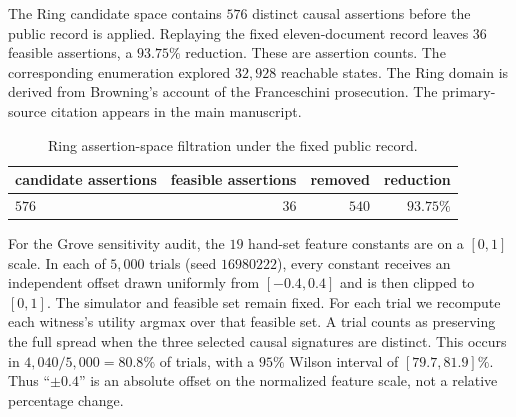 \documentclass[10pt]{article}
\begin{document}
The Ring candidate space contains $576$ distinct causal assertions before the
public record is applied. Replaying the fixed eleven-document record leaves
$36$ feasible assertions, a $93.75\%$ reduction. These are assertion counts.
The corresponding enumeration explored $32{,}928$ reachable states. The
Ring domain is derived from Browning's account of the Franceschini prosecution.
The primary-source citation appears in the main manuscript.

\begin{table}[htbp]
\centering\small
\caption{Ring assertion-space filtration under the fixed public record.}
\label{tab:supp-ring-filtration}
\begin{tabular}{@{}lrrr@{}}
\toprule
candidate assertions & feasible assertions & removed & reduction \\
\midrule
$576$ & $36$ & $540$ & $93.75\%$ \\
\bottomrule
\end{tabular}
\end{table}

For the Grove sensitivity audit, the $19$ hand-set feature constants are on a
$[0,1]$ scale. In each of $5{,}000$ trials (seed $16980222$), every constant
receives an independent offset drawn uniformly from $[-0.4,0.4]$ and is then
clipped to $[0,1]$. The simulator and feasible set remain fixed. For each trial
we recompute each witness's utility argmax over that feasible set. A trial
counts as preserving the full spread when the three selected causal signatures
are distinct. This occurs in $4{,}040/5{,}000=80.8\%$ of trials, with a $95\%$
Wilson interval of $[79.7,81.9]\%$. Thus ``$\pm0.4$'' is an absolute offset on
the normalized feature scale, not a relative percentage change.
\end{document}
